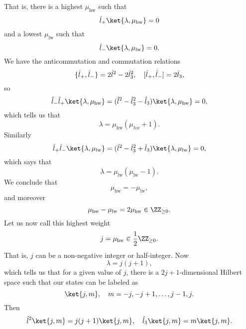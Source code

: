 That is, there is a highest $\mu_\text{hw}$ such that
\begin{equation}
    \hat l_+ \ket{\lambda,\mu_\text{hw}}=0
\end{equation}
and a lowest $\mu_\text{lw}$ such that
\begin{equation}
    \hat l_- \ket{\lambda,\mu_\text{lw}}=0.
\end{equation}
We have the anticommutation and commutation relations
\begin{equation}
    \{\hat l_+,\hat l_-\}= 2\hat l^2 - 2\hat l_3^2,\quad [\hat l_+,\hat l_-] = 2\hat l_3,
\end{equation}
so
\begin{equation}
    \hat l_- \hat l_+ \ket{\lambda,\mu_\text{hw}} = (\hat l^2 - \hat l_3^2 - \hat l_3) \ket{\lambda,\mu_\text{hw}} = 0,
\end{equation}
which tells us that
\begin{equation}
    \lambda = \mu_\text{hw} (\mu_{hw} +1).
\end{equation}
Similarly
\begin{equation}
    \hat l_+ \hat l_- \ket{\lambda,\mu_\text{lw}} = (\hat l^2 - \hat l_3^2 + \hat l_3) \ket{\lambda,\mu_\text{lw}} = 0,
\end{equation}
which says that
\begin{equation}
    \lambda = \mu_\text{lw}(\mu_\text{lw} -1).
\end{equation}
We conclude that
\begin{equation}
    \mu_\text{hw} = -\mu_\text{lw},
\end{equation}
and moreover
\begin{equation}
    \mu_\text{hw} - \mu_\text{lw} = 2\mu_\text{hw} \in \ZZ_{\geq 0}.
\end{equation}
Let us now call this highest weight
\begin{equation}
    j= \mu_\text{hw} \in \frac{1}{2} \ZZ_{\geq 0}.
\end{equation}
That is, $j$ can be a non-negative integer or half-integer. Now
\begin{equation}
    \lambda = j(j+1),
\end{equation}
which tells us that for a given value of $j$, there is a $2j+1$-dimensional Hilbert space such that our states can be labeled as
\begin{equation}
    \ket{j,m}, \quad m=-j, -j+1,\ldots, j-1, j.
\end{equation}
Then
\begin{equation}
    \hat l^2 \ket{j,m} =j(j+1) \ket{j,m},\quad \hat l_3\ket{j,m} = m\ket{j,m}.
\end{equation}

